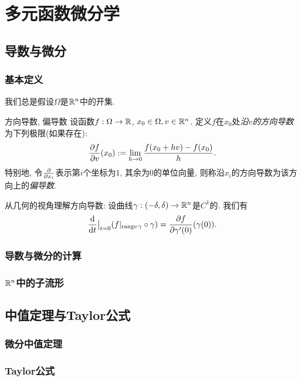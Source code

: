 \chapter{多元函数微分学}

\section{导数与微分}

\subsection{基本定义}

我们总是假设$\Omega$是$\mathbb{R} ^n$中的开集. 

\begin{definition}{方向导数, 偏导数}
    设函数$f:\Omega \to \mathbb{R}$, $x_0 \in \Omega , v \in \mathbb{R} ^n$. 定义$f$在$x_0$处\textit{沿$v$的方向导数}为下列极限(如果存在): $$\frac{\partial f}{\partial v}(x_0) := \lim_{h \to 0} \frac{f(x_0+hv)-f(x_0)}{h}.$$
    特别地, 令$\frac{\partial }{\partial x_i}$表示第$i$个坐标为$1$, 其余为$0$的单位向量, 则称沿$x_i$的方向导数为该方向上的\textit{偏导数}. 
\end{definition}

从几何的视角理解方向导数: 设曲线$\gamma :(-\delta,\delta) \to \mathbb{R} ^n$是$C^1$的. 我们有$$\frac{\mathop{}\!\mathrm{d}}{\mathop{}\!\mathrm{d} t} \big|_{t=0} (f|_{\operatorname{range} \gamma} \circ \gamma) = \frac{\partial f}{\partial \gamma '(0)} (\gamma (0)). $$



\subsection{导数与微分的计算}

\subsection{$\mathbb{R} ^n$中的子流形}

\newpage
\section{中值定理与Taylor公式}

\subsection{微分中值定理}

\subsection{Taylor公式}

